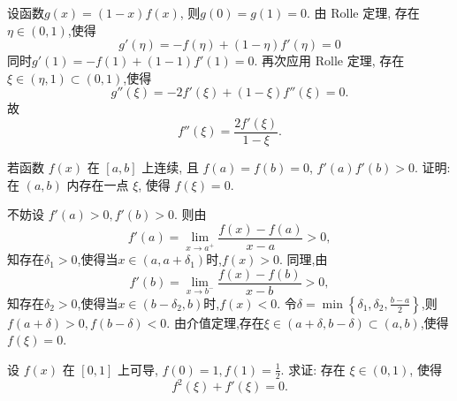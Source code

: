 \begin{solution}
    设函数$g(x) = (1-x)f(x)$, 则$g(0) = g(1) = 0$. 由 Rolle 定理, 存在$\eta \in (0,1)$,使得
    $$g'(\eta) = -f(\eta) + (1-\eta) f'(\eta) = 0$$
    同时$g'(1) = -f(1) + (1-1)f'(1) = 0$. 再次应用 Rolle 定理, 存在$\xi \in (\eta, 1) \subset (0,1)$,使得
    $$g''(\xi) = -2 f'(\xi) + (1-\xi) f''(\xi) = 0.$$
    故
    $$f''(\xi) = \frac{2 f'(\xi)}{1 - \xi}.$$
\end{solution}

\begin{exercise}[3.C.7]
    若函数 $f(x)$ 在 $[a, b]$ 上连续, 且 $f(a) = f(b) = 0$, $f'(a)f'(b) > 0$. 证明: 在 $(a, b)$ 内存在一点 $\xi$, 使得 $f(\xi) = 0$.
\end{exercise}

\begin{solution}
    不妨设 $f'(a) > 0, f'(b) > 0$. 则由$$f'(a) = \lim_{x \to a^+} \frac{f(x) - f(a)}{x - a} > 0,$$知存在$\delta_1 > 0$,使得当$x \in (a, a + \delta_1)$时,$f(x) > 0$. 同理,由$$f'(b) = \lim_{x \to b^-} \frac{f(x) - f(b)}{x - b} > 0,$$知存在$\delta_2 > 0$,使得当$x \in (b - \delta_2, b)$时,$f(x) < 0$. 令$\delta = \min\left\{\delta_1, \delta_2, \frac{b-a}{2}\right\}$,则$f(a + \delta) > 0,f(b - \delta) < 0$. 由介值定理,存在$\xi \in (a + \delta, b - \delta) \subset (a, b)$,使得$f(\xi) = 0$.
\end{solution}

\begin{exercise}[3.C.8]
    设 $f(x)$ 在 $[0, 1]$ 上可导, $f(0) = 1, f(1) = \frac{1}{2}$. 求证: 存在 $\xi \in (0, 1)$, 使得
    $$f^2(\xi) + f'(\xi) = 0.$$
\end{exercise}


